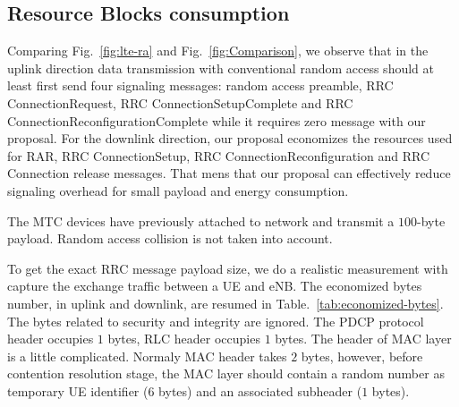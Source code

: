 \subsection{Resource Blocks consumption}
Comparing Fig.~\ref{fig:lte-ra} and Fig.~\ref{fig:Comparison}, we observe that in the uplink direction data transmission with conventional random access should at least first send four signaling messages: random access preamble, RRC ConnectionRequest, RRC ConnectionSetupComplete and RRC ConnectionReconfigurationComplete while it requires zero message with our proposal. For the downlink direction, our proposal economizes the resources used for RAR, RRC ConnectionSetup, RRC ConnectionReconfiguration and RRC Connection release messages. That mens that our proposal can effectively reduce signaling overhead for small payload and energy consumption. 
 
The MTC devices have previously attached to network and transmit a $100$-byte payload. Random access collision is not taken into account. 



To get the exact RRC message payload size, we do a realistic measurement with  capture the exchange traffic between a UE and eNB. The economized bytes number, in uplink and downlink, are resumed in Table.~\ref{tab:economized-bytes}. The bytes related to security and integrity are ignored. The PDCP protocol header occupies $1$ bytes, RLC header occupies $1$ bytes. The header of MAC layer is a little complicated. Normaly MAC header takes $2$ bytes, however, before contention resolution stage, the MAC layer should contain a random number as temporary UE identifier ($6$ bytes) and an associated subheader ($1$ bytes).



